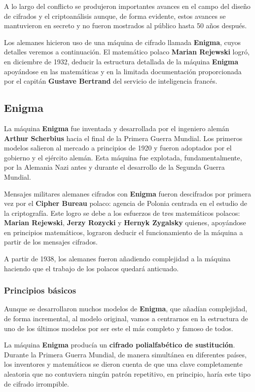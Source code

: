 \documentclass[nochap]{apuntesURJC}
\begin{document}
A lo largo del conflicto se produjeron importantes avances en el campo del diseño de cifrados y el criptoanálisis aunque, de forma evidente, estos avances se mantuvieron en secreto y no fueron mostrados al público hasta 50 años después.

Los alemanes hicieron uso de una máquina de cifrado llamada \textbf{Enigma}, cuyos detalles veremos a continuación. El matemático polaco \textbf{Marian Rejewski} logró, en diciembre de 1932, deducir la estructura detallada de la máquina \textbf{Enigma} apoyándose en las matemáticas y en la limitada documentación proporcionada por el capitán \textbf{Gustave Bertrand} del servicio de inteligencia francés.

\subsection{Enigma}
La máquina \textbf{Enigma} fue inventada y desarrollada por el ingeniero alemán \textbf{Arthur Scherbius} hacia el final de la Primera Guerra Mundial. Los primeros modelos salieron al mercado a principios de 1920 y fueron adoptados por el gobierno y el ejército alemán. Esta máquina fue explotada, fundamentalmente, por la Alemania Nazi antes y durante el desarrollo de la Segunda Guerra Mundial.

Mensajes militares alemanes cifrados con \textbf{Enigma} fueron descifrados por primera vez por el \textbf{Cipher Bureau} polaco: agencia de Polonia centrada en el estudio de la criptografía. Este logro se debe a los esfuerzos de tres matemáticos polacos: \textbf{Marian Rejewski}, \textbf{Jerzy Rozycki} y \textbf{Hernyk Zygalsky} quienes, apoyándose en principios matemáticos, lograron deducir el funcionamiento de la máquina a partir de los mensajes cifrados.

A partir de 1938, los alemanes fueron añadiendo complejidad a la máquina haciendo que el trabajo de los polacos quedará anticuado.

\subsubsection{Principios básicos}

Aunque se desarrollaron muchos modelos de \textbf{Enigma}, que añadían complejidad, de forma incremental, al modelo original, vamos a centrarnos en la estructura de uno de los últimos modelos por ser este el más completo y famoso de todos.

La máquina \textbf{Enigma} producía un \textbf{cifrado polialfabético de sustitución}. Durante la Primera Guerra Mundial, de manera simultánea en diferentes países, los inventores y matemáticos se dieron cuenta de que una clave completamente aleatoria que no contuviera ningún patrón repetitivo, en principio, haría este tipo de cifrado irrompible.
\end{document}
